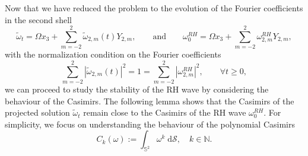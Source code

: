 \documentclass{amsart}
\def\enne{{\mathbb{N}}}
\begin{document}
Now that we have reduced the problem to the evolution of the Fourier coefficients in the second shell
\begin{equation}
    \tilde\omega_t = \Omega x_3 + \sum_{m=-2}^2 \tilde\omega_{2,m}(t) Y_{2,m},\qquad\mbox{and}\qquad \omega_0^{RH} = \Omega x_3 + \sum_{m=-2}^2 \omega^{RH}_{2,m} Y_{2,m},
    \label{eq:projected_solution}
\end{equation}
with the normalization condition on the Fourier coefficients
\begin{equation}
    \sum_{m=-2}^2 |\tilde\omega_{2,m}(t)|^2 = 1= \sum_{m=-2}^2 |\omega^{RH}_{2,m}|^2,
    \qquad \forall t \geq 0,
    \label{eq:normalization_condition}
\end{equation}
we can proceed to study the stability of the RH wave by considering the behaviour of the Casimirs. The following lemma shows that the Casimirs of the projected solution $\tilde\omega_t$ remain close to the Casimirs of the RH wave $\omega_0^{RH}$. For simplicity, we focus on understanding the behaviour of the polynomial Casimirs
    \begin{equation}
        C_k(\omega):=\int_{\mathbb{S}^2}\omega^k\;\mathrm{d}\mathcal{S},\quad k\in\enne.
        \label{eq:PolCasimirs} 
    \end{equation}
\end{document}
